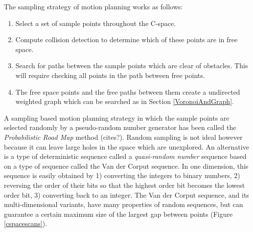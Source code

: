 The sampling strategy of motion planning works as follows:
\begin{enumerate}
  \item  Select a set of sample points throughout the C-space.
  \item  Compute collision detection to determine which of these points are in free space. 
  \item  Search for paths between the sample points which are clear of obstacles.  This will require checking all points in the path between free points. 
  \item  The free space points and the free paths between them create a undirected weighted graph which can be searched as in Section \ref{VoronoiAndGraph}.
\end{enumerate}

A sampling based motion planning strategy in which the sample points are selected randomly by a pseudo-random number generator has been called the \textit{Probabilistic Road Map} method (cites?).  Random sampling is not ideal however because it can leave large holes in the space which are unexplored.  An alternative is  a type of deterministic sequence called a {\it quasi-random number} sequence based on a type of sequence called the Van der Corput sequence.  In one dimension, this sequence is easily obtained by 1) converting the integers to binary numbers, 2) reversing the order of their bits so that the highest order bit becomes the lowest order bit, 3) converting back to an integer.  The Van der Corput sequence, and its multi-dimensional variants, have many properties of random sequences, but can guarantee a certain maximum size of the largest gap between points (Figure \ref{cspacescans}).

